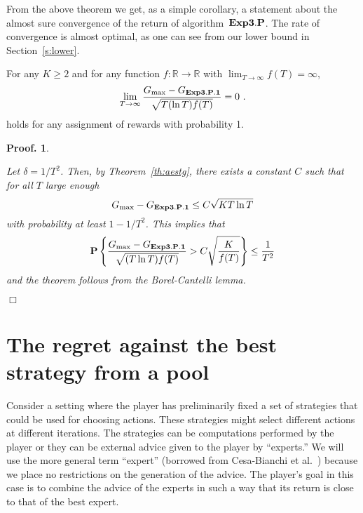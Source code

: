 \documentclass[12pt]{article}
\newcommand{\Aesthp}{{\bf Exp3.P}}
\newcommand{\Aestg}{{\bf Exp3.P.1}}
\newcommand{\field}[1]{\mathbb{#1}}
\newcommand{\R}{\field{R}}
\newcommand{\prop}[1]{\mbox{\bf P}\left\{#1\right\}}
\newcommand{\Gbest}{G_{\rm max}}
\newtheorem{pproof}{Proof.}
\newenvironment{proof}{
\begin{pproof}
        \begin{rm}\begin{rm}}{
        \hspace*{\fill} $\Box$
        \end{rm}\end{rm}
        \end{pproof}
}
\begin{document}
%
 From the above theorem we get, as a simple corollary, a statement about
the almost sure convergence of the return of algorithm~$\Aesthp$.
The rate of convergence is almost optimal, as one can see from our lower
bound in Section~\ref{s:lower}.
%
\begin{cor}
\label{cor:prob-one}
For any $K\geq 2$ and for any function $f:\R\to\R$ with
$\lim_{T\to\infty} f(T) = \infty$,
\[
        \lim_{T \to \infty} \frac{\Gbest - G_{\Aestg}}{\sqrt{T(\ln T)f(T)}} = 0~.
\] 
holds for any assignment of rewards with probability 1.
\end{cor}
\begin{proof}
Let $\delta = 1/T^2$. Then, by Theorem~\ref{th:aestg}, there exists a constant $C$ such
that for all $T$ large enough
\[
        \Gbest - G_{\Aestg}
\leq
        C\sqrt{KT\ln T}
\]
with probability at least $1-1/T^2$. This implies that
\[
        \prop{\frac{\Gbest - G_{\Aestg}}{\sqrt{(T\ln T)f(T)}} >
        C\sqrt{\frac{K}{f(T)}}} \leq \frac{1}{T^2}
\]
and the theorem follows from the Borel-Cantelli lemma.
\end{proof}

\section{The regret against the best strategy from a pool}
\label{s:experts}
Consider a setting where the player has preliminarily fixed a set of
strategies that could be used for choosing actions. These strategies
might select different actions at different iterations.
The strategies can be computations performed by the player or they
can be external advice given to the player by ``experts.''
We will use the more general term ``expert'' 
(borrowed from Cesa-Bianchi et al.~\cite{CesabianchiFrHeHaScWa97})
because we place no restrictions on the generation of the advice. 
The player's goal in this case is to combine the advice of the experts
in such a way that its return is close to that of the best expert.
\end{document}
